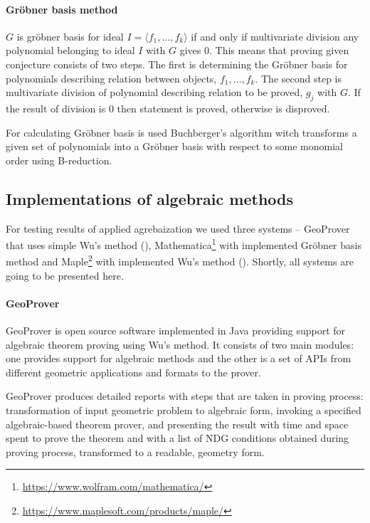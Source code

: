 \documentclass[final,1p,times,authoryear]{elsarticle}
\begin{document}
\paragraph{Gr\"obner basis method}

$G$ is gr\"obner basis for ideal $I = \langle f_1, \ldots, f_k
\rangle$ if and only if multivariate division any polynomial belonging
to ideal $I$ with $G$ gives $0$. This means that proving given
conjecture consists of two steps. The first is determining the
Gr\"obner basis for polynomials describing relation between objects,
$f_1, \ldots, f_k$. The second step is multivariate division of
polynomial describing relation to be proved, $g_j$ with $G$. If the
result of division is $0$ then statement is proved, otherwise is
disproved.

For calculating Gr\"obner basis is used Buchberger's algorithm witch
transforms a given set of polynomials into a Gr\"obner basis with
respect to some monomial order using B-reduction.

\subsection{Implementations of algebraic methods}

For testing results of applied agrebaization we used three systems --
GeoProver that uses simple Wu's method (\cite{geoprover}),
Mathematica\footnote{\url{https://www.wolfram.com/mathematica/}} with
implemented Gr\"obner basis method and
Maple\footnote{\url{https://www.maplesoft.com/products/maple/}} with
implemented Wu's method (\cite{wsolve}). Shortly, all systems are
going to be presented here.

\paragraph{GeoProver}

GeoProver is open source software implemented in Java providing
support for algebraic theorem proving using Wu's method. It consists
of two main modules: one provides support for algebraic methods and
the other is a set of APIs from different geometric applications and
formats to the prover.

GeoProver produces detailed reports with steps that are taken in
proving process: transformation of input geometric problem to
algebraic form, invoking a specified algebraic-based theorem prover,
and presenting the result with time and space spent to prove the
theorem and with a list of NDG conditions obtained during proving
process, transformed to a readable, geometry form.
\end{document}
